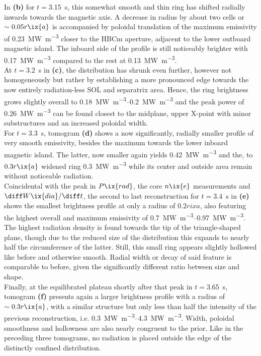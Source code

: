             In \textbf{(b)} for $t=$\SI{3.15}{\second}, this somewhat smooth and thin ring has shifted radially inwards towards the magnetic axis. A decrease in radius by about two cells or $\sim0.05r\ix{a}$ is accompanied by poloidal translation of the maximum emissivity of \SI{0.23}{\mega\watt\per\cubic\meter} closer to the HBCm aperture, adjacent to the lower outboard magnetic island. The inboard side of the profile is still noticeably brighter with \SI{0.17}{\mega\watt\per\cubic\meter} compared to the rest at \SI{0.13}{\mega\watt\per\cubic\meter}.\\%
            At $t=$\SI{3.2}{\second} in \textbf{(c)}, the distribution has shrunk even further, however not homogeneously but rather by establishing a more pronounced edge towards the now entirely radiation-less SOL and separatrix area. Hence, the ring brightness grows slightly overall to \SIrange{0.18}{0.2}{\mega\watt\per\cubic\meter} and the peak power of \SI{0.26}{\mega\watt\per\cubic\meter} can be found closest to the midplane, upper X-point with minor substructures and an increased poloidal width.\\%
            For $t=$\SI{3.3}{\second}, tomogram \textbf{(d)} shows a now significantly, radially smaller profile of very smooth emissivity, besides the maximum towards the lower inboard magnetic island. The latter, now smaller again yields \SI{0.42}{\mega\watt\per\cubic\meter} and the, to $0.3r\ix{a}$ widened ring \SI{0.3}{\mega\watt\per\cubic\meter} while its center and outside area remain without noticeable radiation.\\%
            Coincidental with the peak in $P\ix{rad}$, the core $n\ix{e}$ measurements and $\diff W\ix{dia}/\diff t$, the second to last reconstruction for $t=$\SI{3.4}{\second} in \textbf{(e)} shows the smallest brightness profile at only a radius of $0.2rix{a}$, also featuring the highest overall and maximum emissivity of \SIrange{0.7}{0.97}{\mega\watt\per\cubic\meter}. The highest radiation density is found towards the tip of the triangle-shaped plane, though due to the reduced size of the distribution this expands to nearly half the circumference of the latter. Still, this small ring appears slightly hollowed like before and otherwise smooth. Radial width or decay of said feature is comparable to before, given the significantly different ratio between size and shape.\\%
            Finally, at the equilibrated plateau shortly after that peak in $t=$\SI{3.65}{\second}, tomogram \textbf{(f)} presents again a larger brightness profile with a radius of $\sim0.3r\ix{a}$, with a similar structure but only less than half the intensity of the previous reconstruction, i.e. \SIrange{0.3}{4.3}{\mega\watt\per\cubic\meter}. Width, poloidal smoothness and hollowness are also nearly congruent to the prior. Like in the preceding three tomograms, no radiation is placed outside the edge of the distinctly confined distribution.\\%
